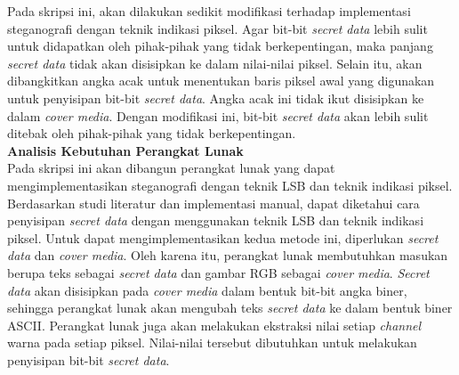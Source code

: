 \documentclass[a4paper,twoside]{article}
\begin{document}
\begin{enumerate}
		Pada skripsi ini, akan dilakukan sedikit modifikasi terhadap implementasi steganografi dengan teknik indikasi piksel. Agar bit-bit \textit{secret data} lebih sulit untuk didapatkan oleh pihak-pihak yang tidak berkepentingan, maka panjang \textit{secret data} tidak akan disisipkan ke dalam nilai-nilai piksel. Selain itu, akan dibangkitkan angka acak untuk menentukan baris piksel awal yang digunakan untuk penyisipan bit-bit \textit{secret data}. Angka acak ini tidak ikut disisipkan ke dalam \textit{cover media}. Dengan modifikasi ini, bit-bit \textit{secret data} akan lebih sulit ditebak oleh pihak-pihak yang tidak berkepentingan.\\	
		
		\textbf{Analisis Kebutuhan Perangkat Lunak}\\		 
		Pada skripsi ini akan dibangun perangkat lunak yang dapat mengimplementasikan steganografi dengan teknik LSB dan teknik indikasi piksel. Berdasarkan studi literatur dan implementasi manual, dapat diketahui cara penyisipan \textit{secret data} dengan menggunakan teknik LSB dan teknik indikasi piksel. Untuk dapat mengimplementasikan kedua metode ini, diperlukan \textit{secret data} dan \textit{cover media}. Oleh karena itu, perangkat lunak membutuhkan masukan berupa teks sebagai \textit{secret data} dan gambar RGB sebagai \textit{cover media}. \textit{Secret data} akan disisipkan pada \textit{cover media} dalam bentuk bit-bit angka biner, sehingga perangkat lunak akan mengubah teks \textit{secret data} ke dalam bentuk biner ASCII. Perangkat lunak juga akan melakukan ekstraksi nilai setiap \textit{channel} warna pada setiap piksel. Nilai-nilai tersebut dibutuhkan untuk melakukan penyisipan bit-bit \textit{secret data}.\\
		

\end{enumerate}
\end{document}
